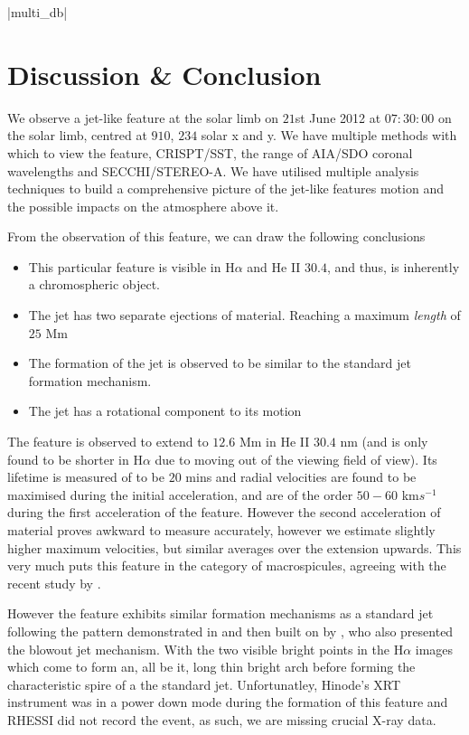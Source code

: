 \documentclass{emulateapj}
\begin{document}
|multi_db|


\section{Discussion \& Conclusion}

We observe a jet-like feature at the solar limb on $21$st June 2012 at $07:30:00$ on the solar limb, centred at $910$, $234$ solar x and y.
We have multiple methods with which to view the feature, CRISPT/SST, the range of AIA/SDO coronal wavelengths and SECCHI/STEREO-A.
We have utilised multiple analysis techniques to build a comprehensive picture of the jet-like features motion and the possible impacts on the atmosphere above it.

From the observation of this feature, we can draw the following conclusions
\begin{itemize}
	\item{This particular feature is visible in H$\alpha$ and He II $30.4$, and thus, is inherently a chromospheric object.}
	\item{The jet has two separate ejections of material. Reaching a maximum \emph{length} of $25$ Mm}
	\item{The formation of the jet is observed to be similar to the standard jet formation mechanism.}
	\item{The jet has a rotational component to its motion}
\end{itemize}

The feature is observed to extend to $12.6$ Mm in He II $30.4$ nm (and is only found to be shorter in H$\alpha$ due to moving out of the viewing field of view).
Its lifetime is measured of to be $20$ mins and radial velocities are found to be maximised during the initial acceleration, and are of the order $50 - 60$ km$s^{-1}$ during the first acceleration of the feature.
However the second acceleration of material proves awkward to measure accurately, however we estimate slightly higher maximum velocities, but similar averages over the extension upwards. 
This very much puts this feature in the category of macrospicules, agreeing with the recent study by \cite{Bennett2015}.

However the feature exhibits similar formation mechanisms as a standard jet following the pattern demonstrated in \cite{Shibata1992} and then built on by \cite{Moore2010}, who also presented the blowout jet mechanism.
With the two visible bright points in the H$\alpha$ images which come to form an, all be it, long thin bright arch before forming the characteristic spire of a the standard jet.
Unfortunatley, Hinode's XRT instrument was in a power down mode during the formation of this feature and RHESSI did not record the event, as such, we are missing crucial X-ray data.
\end{document}
